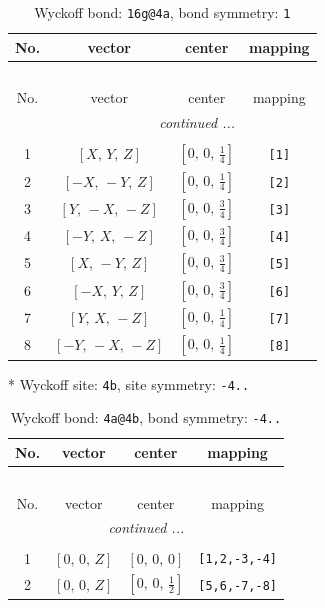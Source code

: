 \documentclass[fleqn,8pt]{jsarticle}
\begin{document}
\renewcommand{\arraystretch}{1.2}
\begin{longtable}{cccc}
\caption{Wyckoff bond: {\tt 16g@4a}, bond symmetry: {\tt 1}}
 \\
 \hline \hline
No. & vector & center & mapping \\ \hline \endfirsthead

\multicolumn{3}{l}{\tablename\ \thetable{}} \\
 \hline \hline
No. & vector & center & mapping \\ \hline \endhead

 \hline \hline
\multicolumn{3}{r}{\footnotesize\it continued ...} \\ \endfoot

 \hline \hline
\multicolumn{3}{r}{} \\ \endlastfoot

1 & $\left[ X,\, Y,\, Z \right]$ & $\left[ 0,\, 0,\, \frac{1}{4} \right]$ & {\tt [1]} \\ \hline
2 & $\left[ - X,\, - Y,\, Z \right]$ & $\left[ 0,\, 0,\, \frac{1}{4} \right]$ & {\tt [2]} \\ \hline
3 & $\left[ Y,\, - X,\, - Z \right]$ & $\left[ 0,\, 0,\, \frac{3}{4} \right]$ & {\tt [3]} \\ \hline
4 & $\left[ - Y,\, X,\, - Z \right]$ & $\left[ 0,\, 0,\, \frac{3}{4} \right]$ & {\tt [4]} \\ \hline
5 & $\left[ X,\, - Y,\, Z \right]$ & $\left[ 0,\, 0,\, \frac{3}{4} \right]$ & {\tt [5]} \\ \hline
6 & $\left[ - X,\, Y,\, Z \right]$ & $\left[ 0,\, 0,\, \frac{3}{4} \right]$ & {\tt [6]} \\ \hline
7 & $\left[ Y,\, X,\, - Z \right]$ & $\left[ 0,\, 0,\, \frac{1}{4} \right]$ & {\tt [7]} \\ \hline
8 & $\left[ - Y,\, - X,\, - Z \right]$ & $\left[ 0,\, 0,\, \frac{1}{4} \right]$ & {\tt [8]} \\
\end{longtable}
* Wyckoff site: {\tt 4b}, site symmetry: {\tt -4..}
\renewcommand{\arraystretch}{1.2}
\begin{longtable}{cccc}
\caption{Wyckoff bond: {\tt 4a@4b}, bond symmetry: {\tt -4..}}
 \\
 \hline \hline
No. & vector & center & mapping \\ \hline \endfirsthead

\multicolumn{3}{l}{\tablename\ \thetable{}} \\
 \hline \hline
No. & vector & center & mapping \\ \hline \endhead

 \hline \hline
\multicolumn{3}{r}{\footnotesize\it continued ...} \\ \endfoot

 \hline \hline
\multicolumn{3}{r}{} \\ \endlastfoot

1 & $\left[ 0,\, 0,\, Z \right]$ & $\left[ 0,\, 0,\, 0 \right]$ & {\tt [1,2,-3,-4]} \\ \hline
2 & $\left[ 0,\, 0,\, Z \right]$ & $\left[ 0,\, 0,\, \frac{1}{2} \right]$ & {\tt [5,6,-7,-8]} \\
\end{longtable}
\end{document}
